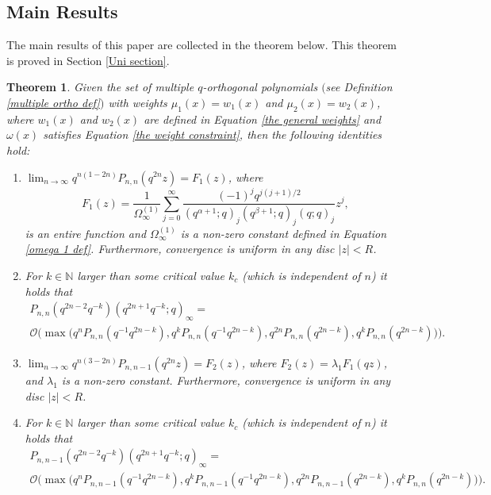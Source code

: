 \documentclass[a4paper,reqno]{amsart}
\numberwithin{equation}{section}
\newtheorem{theorem}{Theorem}[section]
\numberwithin{figure}{section}
\begin{document}
\subsection{Main Results}
The main results of this paper are collected in the theorem below. This theorem is proved in Section \ref{Uni section}.
\begin{theorem}\label{Main theorem}
Given the set of multiple $q$-orthogonal polynomials $($see Definition \ref{multiple ortho def}$)$ with weights $\mu_1(x)=w_1(x)$ and $\mu_2(x)=w_2(x)$, where $w_1(x)$ and $w_2(x)$ are defined in Equation \eqref{the general weights} and $\omega(x)$ satisfies Equation \eqref{the weight constraint}, then the following identities hold:
      \begin{enumerate}
    \item $\lim_{n\to\infty} q^{n(1-2n)}P_{n,n}(q^{2n}z) = F_1(z)$, where 
     \[F_1(z)=\frac{1}{\Omega^{(1)}_\infty}\sum_{j=0}^\infty \frac{(-1)^jq^{j(j+1)/2}}{(q^{\alpha+1};q)_j(q^{\beta+1};q)_j(q;q)_j}z^j,\]
     is an entire function and $\Omega^{(1)}_\infty$ is a non-zero constant defined in Equation \eqref{omega 1 def}. Furthermore, convergence is uniform in any disc $|z|<R$.
        \item For $k\in\mathbb{N}$ larger than some critical value $k_c$ (which is independent of $n$) it holds that
        \begin{multline}\nonumber
            P_{n,n}(q^{2n-2}q^{-k})(q^{2n+1}q^{-k};q)_\infty = \\ \mathcal{O}\Big(\max\big(q^{n}P_{n,n}(q^{-1}q^{2n-k}), q^{k}P_{n,n}(q^{-1}q^{2n-k}), q^{2n}P_{n,n}(q^{2n-k}),q^{k}P_{n,n}(q^{2n-k})\big)\Big).
        \end{multline}

        \item $\lim_{n\to\infty} q^{n(3-2n)}P_{n,n-1}(q^{2n}z) = F_2(z)$, where $F_2(z)=\lambda_1F_1(qz)$, and $\lambda_1$ is a non-zero constant. Furthermore, convergence is uniform in any disc $|z|<R$.
        \item For $k\in\mathbb{N}$ larger than some critical value $k_c$ (which is independent of $n$) it holds that
        \begin{multline}\nonumber 
            P_{n,n-1}(q^{2n-2}q^{-k})(q^{2n+1}q^{-k};q)_\infty = \\ \mathcal{O}\Big(\max\big(q^{n}P_{n,n-1}(q^{-1}q^{2n-k}), q^{k}P_{n,n-1}(q^{-1}q^{2n-k}), q^{2n}P_{n,n-1}(q^{2n-k}),q^{k}P_{n,n}(q^{2n-k})\big)\Big).
        \end{multline}


\end{enumerate}
\end{theorem}
\end{document}
